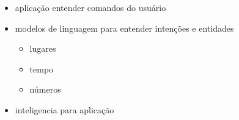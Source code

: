 
\begin{itemize}
	\item aplicação entender comandos do usuário
	\item modelos de linguagem para entender intenções e entidades
		\begin{itemize}
			\item lugares
			\item tempo
			\item números
		\end{itemize}
	\item inteligencia para aplicação
\end{itemize}
